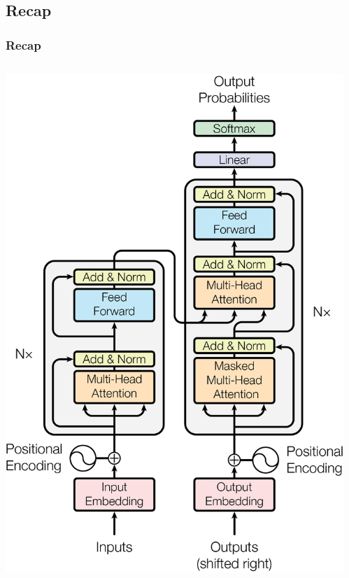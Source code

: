 \documentclass[]{beamer}
\begin{document}
\subsection{Recap}
\begin{frame}
    \frametitle{Recap}
    \begin{columns}
        \begin{column}[]{0.5\textwidth}
            \includegraphics[scale = 0.4]{ModalNet-21.png}
        \end{column}
        \begin{column}[]{0.5\textwidth}

\end{column}
\end{columns}
\end{frame}
\end{document}
